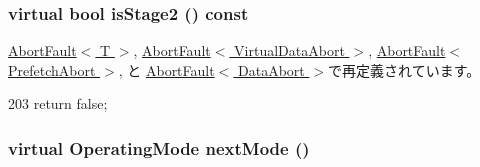 {
\subsubsection[{isStage2}]{\setlength{\rightskip}{0pt plus 5cm}virtual bool isStage2 () const}}
\label{classArmISA_1_1ArmFault_a61bc59380024a05bdcbb39fb27e0293d}


\hyperlink{classArmISA_1_1AbortFault_abb0e34fd2d22460e7779f419601dc6dc}{AbortFault$<$ T $>$}, \hyperlink{classArmISA_1_1AbortFault_abb0e34fd2d22460e7779f419601dc6dc}{AbortFault$<$ VirtualDataAbort $>$}, \hyperlink{classArmISA_1_1AbortFault_abb0e34fd2d22460e7779f419601dc6dc}{AbortFault$<$ PrefetchAbort $>$}, と \hyperlink{classArmISA_1_1AbortFault_abb0e34fd2d22460e7779f419601dc6dc}{AbortFault$<$ DataAbort $>$}で再定義されています。


\begin{DoxyCode}
203 { return false; }
\end{DoxyCode}
\hypertarget{classArmISA_1_1ArmFault_a245c0940c93d0130b3efaf4e1d8ad542}{
\subsubsection[{nextMode}]{\setlength{\rightskip}{0pt plus 5cm}virtual {\bf OperatingMode} nextMode ()}}
\label{classArmISA_1_1ArmFault_a245c0940c93d0130b3efaf4e1d8ad542}


